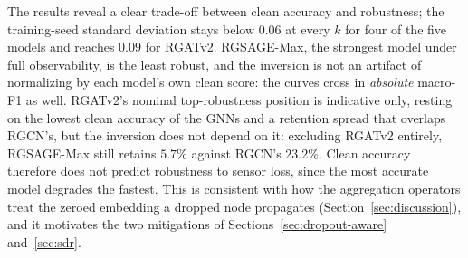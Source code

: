 \documentclass[3p,times,procedia]{elsarticle}
\begin{document}
The results reveal a clear trade-off between clean accuracy and robustness; the training-seed standard deviation stays below $0.06$ at every $k$ for four of the five models and reaches $0.09$ for RGATv2. RGSAGE-Max, the strongest model under full observability, is the least robust, and the inversion is not an artifact of normalizing by each model's own clean score: the curves cross in \emph{absolute} macro-F1 as well. RGATv2's nominal top-robustness position is indicative only, resting on the lowest clean accuracy of the GNNs and a retention spread that overlaps RGCN's, but the inversion does not depend on it: excluding RGATv2 entirely, RGSAGE-Max still retains $5.7\%$ against RGCN's $23.2\%$. Clean accuracy therefore does not predict robustness to sensor loss, since the most accurate model degrades the fastest. This is consistent with how the aggregation operators treat the zeroed embedding a dropped node propagates (Section~\ref{sec:discussion}), and it motivates the two mitigations of Sections~\ref{sec:dropout-aware} and~\ref{sec:sdr}.
\end{document}
